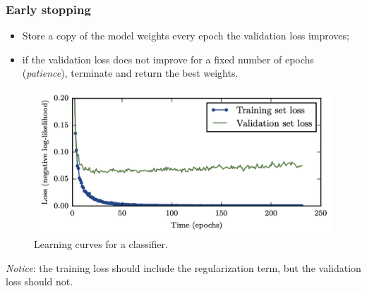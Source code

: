 \documentclass{beamer}
\begin{document}
	\begin{frame}
		\frametitle{Early stopping}
		\begin{itemize}
			\item Store a copy of the model weights every epoch the validation loss improves;
			\item if the validation loss does not improve for a fixed number of epochs (\textit{patience}), terminate and return the best weights.
		\end{itemize}
		\begin{figure}
			\centering
			\includegraphics[scale=0.45]{images/early_stopping}
			\caption{Learning curves for a classifier.}
		\end{figure}
		
		\textit{Notice}: the training loss should include the regularization term, but the validation loss should not.
	\end{frame}
	

	
\end{document}
